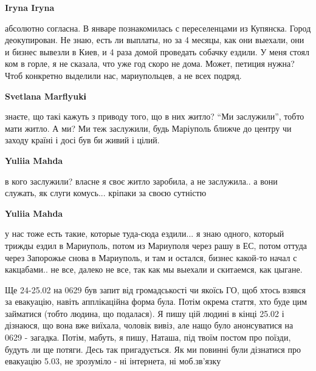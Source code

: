 \begin{itemize}
\textbf{Iryna Iryna}

абсолютно согласна. В январе познакомилась с переселенцами из Купянска. Город
деокупирован. Не знаю, есть ли выплаты, но за 4 месяцы, как они выехали, они и
бизнес вывезли в Киев, и 4 раза домой проведать собачку ездили. У меня стоял
ком в горле, я не сказала, что уже год скоро не дома. Может, петиция нужна?
Чтоб конкретно выделили нас, мариупольцев, а не всех подряд.

\textbf{Svetlana Marflyukі} 

знаєте, що такі кажуть з приводу того, що в них житло? \enquote{Ми заслужили}, тобто
мати житло. А ми? Ми теж заслужили, будь Маріуполь ближче до центру чи заходу
країні і досі був би живий і цілий.

\textbf{Yuliia Mahda} 

в кого заслужили? власне я своє житло заробила, а не заслужила.. а вони
служать, як слуги комусь... кріпаки за своєю сутністю

\textbf{Yuliia Mahda} 

у нас тоже есть такие, которые туда-сюда ездили... я знаю одного, который трижды
ездил в Мариуполь, потом из Мариуполя через рашу в ЕС, потом оттуда через
Запорожье снова в Мариуполь, и там и остался, бизнес какой-то начал с
какцабами.. не все, далеко не все, так как мы выехали и скитаемся, как цыгане.

\end{itemize} %


Ще 24-25.02 на 0629 був запит від громадськості чи якоїсь ГО, щоб хтось взявся
за евакуацію, навіть апплікаційна форма була. Потім окрема стаття, хто буде цим
займатися (тобто людина, що подалася). Я пишу цій людині в кінці 25.02 і
дізнаюся, що вона вже виїхала, чоловік вивіз, але нащо було анонсуватися на
0629 - загадка. Потім, мабуть, я пишу, Наташа, під твоїм постом про поїзди,
будуть ли ще потяги. Десь так пригадується. Як ми повинні були дізнатися про
евакуацію 5.03, не зрозуміло - ні інтернета, ні моб.зв'язку

